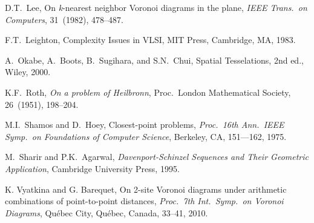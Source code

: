 \documentclass[10pt, conference, compsocconf]{IEEEtran}
\begin{document}
\begin{thebibliography}{99}
{\sc D.T.~Lee},
On \emph{k}-nearest neighbor Voronoi diagrams in the plane,
\emph{IEEE Trans.\ on Computers},
31~(1982), 478--487.

{\sc F.T.~Leighton},
Complexity Issues in VLSI,
MIT Press, Cambridge, MA, 1983.

{\sc A.~Okabe, A.~Boots, B.~Sugihara, and S.N.~Chui},
Spatial Tesselations, 2nd ed.,
Wiley, 2000.

{\sc K.F.~Roth},
{\em On a problem of Heilbronn},
Proc.\ London Mathematical Society,
26~(1951), 198--204.

{\sc M.I.~Shamos and D.~Hoey},
Closest-point problems,
\emph{Proc.\ 16th Ann.\ IEEE Symp.\ on Foundations of Computer Science},
Berkeley, CA,
151---162, 1975.

{\sc M.~Sharir and P.K.~Agarwal},
\emph{Davenport-Schinzel Sequences and Their Geometric Application},
Cambridge University Press, 1995.

{\sc K. Vyatkina and G. Barequet},
On 2-site Voronoi diagrams under arithmetic combinations of
point-to-point distances,
\emph{Proc.\ 7th Int.\ Symp.\ on Voronoi Diagrams},
Qu\'{e}bec City, Qu\'{e}bec, Canada, 33--41, 2010.

\end{thebibliography}
\end{document}
